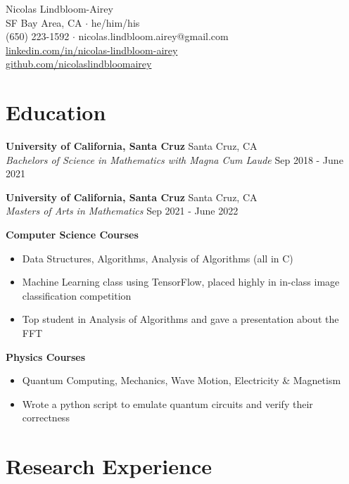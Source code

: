 \documentclass[10pt,letterpaper]{article}
\begin{document}
\begin{center}{\Huge Nicolas Lindbloom-Airey}\\
SF Bay Area, CA $\cdot$ he/him/his \\
(650) 223-1592 $\cdot$ nicolas.lindbloom.airey@gmail.com\\
 \href{https://www.linkedin.com/in/nicolas-lindbloom-airey/}{linkedin.com/in/nicolas-lindbloom-airey} \\
 \href{https://github.com/nicolaslindbloomairey}{github.com/nicolaslindbloomairey} \\
\end{center}


\section*{Education} \hrulefill 

\textbf{University of California, Santa Cruz} \hfill  Santa Cruz, CA\\
\textit{Bachelors of Science in Mathematics with Magna Cum Laude} \hfill  Sep 2018 - June 2021

\textbf{University of California, Santa Cruz} \hfill  Santa Cruz, CA\\
\textit{Masters of Arts in Mathematics} \hfill  Sep 2021 - June 2022


\textbf{Computer Science Courses}
\begin{itemize}
    \item Data Structures, Algorithms, Analysis of Algorithms (all in C)
    \item Machine Learning class using TensorFlow, placed highly in in-class image classification competition
    \item Top student in Analysis of Algorithms and gave a presentation about the FFT
\end{itemize}

\textbf{Physics Courses}
\begin{itemize}
    \item Quantum Computing, Mechanics, Wave Motion, Electricity \& Magnetism
    \item Wrote a python script to emulate quantum circuits and verify their correctness
\end{itemize}


\section*{Research Experience} \hrulefill
\end{document}
